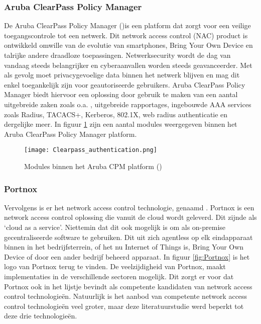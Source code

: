\subsubsection{\bf Aruba ClearPass Policy Manager}
De Aruba ClearPass Policy Manager (\cite{ArubaCPPM})is een platform dat zorgt voor een veilige toegangscontrole tot een netwerk. Dit network access control (NAC) product is ontwikkeld omwille van de evolutie van smartphones, Bring Your Own Device en talrijke andere draadloze toepassingen. 
\newline
\newline
Netwerksecurity wordt de dag van vandaag steeds belangrijker en cyberaanvallen worden steeds geavanceerder. Met als gevolg moet privacygevoelige data binnen het netwerk blijven en mag dit enkel toegankelijk zijn voor geautoriseerde gebruikers. Aruba ClearPass Policy Manager biedt hiervoor een oplossing door gebruik te maken van een aantal uitgebreide zaken zoals o.a. , uitgebreide rapportages, ingebouwde AAA services zoals Radius, TACACS+, Kerberos, 802.1X, web radius authenticatie en dergelijke meer. In figuur \ref{fig:ArubaClearPass} zijn een aantal modules weergegeven binnen het Aruba ClearPass Policy Manager platform. 

\begin{figure}[H]
	\centering
	\texttt{[image: Clearpass\_authentication.png]}
	\caption{Modules binnen het Aruba CPM platform (\cite{ACPMModule})}
	\label{fig:ArubaClearPass}
\end{figure}

\subsubsection{\bf Portnox}
Vervolgens is er het network access control technologie, genaamd \cite{Portnox}. Portnox is een network access control oplossing die vanuit de cloud wordt geleverd. Dit zijnde als ‘cloud as a service’. Niettemin dat dit ook mogelijk is om als on-premise gecentraliseerde software te gebruiken. Dit uit zich agentless op elk eindapparaat binnen in het bedrijfsterrein, of het nu Internet of Things is, Bring Your Own Device of door een ander bedrijf beheerd apparaat. In figuur \ref{fig:Portnox} is het logo van Portnox terug te vinden.
\newline
\newline
De veelzijdigheid van Portnox, maakt implementaties in de verschillende sectoren mogelijk. Dit zorgt er voor dat Portnox ook in het lijstje bevindt als competente kandidaten van network access control technologieën. Natuurlijk is het aanbod van competente network access control technologieën veel groter, maar deze literatuurstudie werd beperkt tot deze drie technologieën. 

